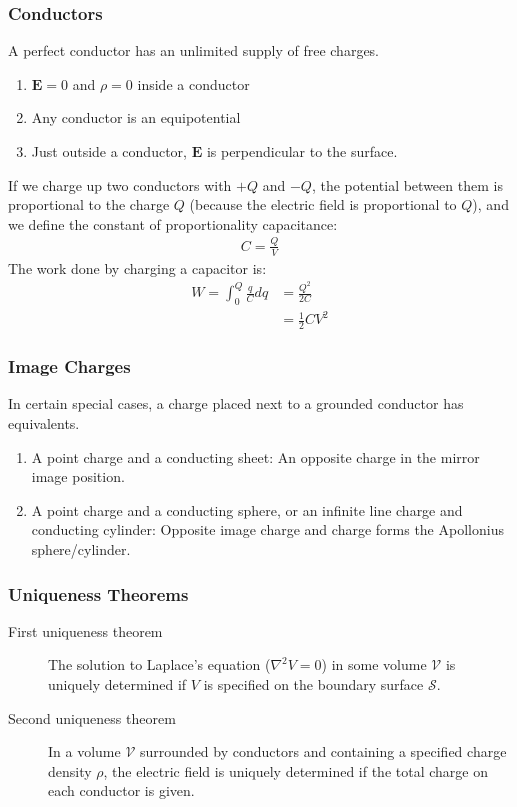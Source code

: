 \documentclass[a4paper]{article}
\newcommand{\ve}[1]{
  \ensuremath{\bm{#1}}}	               %
\begin{document}
\begin{multicols*}{2}
\subsubsection{Conductors}
A perfect conductor has an unlimited supply of free charges.
\begin{enumerate}
\item $\ve{E}=0$ and $\rho = 0$ inside a conductor
\item Any conductor is an equipotential
\item Just outside a conductor, $\ve{E}$ is perpendicular to the surface.
\end{enumerate}
If we charge up two conductors with $+Q$ and $-Q$, the potential between them is
proportional to the charge $Q$ (because the electric field is proportional to
$Q$), and we define the constant of proportionality capacitance:
\begin{align*}
  C=\frac{Q}{V}
\end{align*}
The work done by charging a capacitor is:
\begin{align*}
  W=\int_0^Q \frac{q}{C} dq &= \frac{Q^2}{2C}\\
  &=\frac{1}{2}CV^2
\end{align*}
\subsubsection{Image Charges}
In certain special cases, a charge placed next to a grounded conductor has
equivalents.
\begin{enumerate}
\item A point charge and a conducting sheet: An opposite charge in the mirror
  image position.
\item A point charge and a conducting sphere, or an infinite line charge and
  conducting cylinder: Opposite image charge and charge forms the Apollonius
  sphere/cylinder.
\end{enumerate}
\subsubsection{Uniqueness Theorems}
\begin{description}
\item[First uniqueness theorem] The solution to Laplace's equation
  ($\nabla^2V=0$) in some volume $\mathcal{V}$ is uniquely determined if $V$ is
  specified on the boundary surface $\mathcal{S}$.
\item[Second uniqueness theorem] In a volume $\mathcal{V}$ surrounded by
  conductors and containing a specified charge density $\rho$, the electric
  field is uniquely determined if the total charge on each conductor is given.
\end{description}

\end{multicols*}
\end{document}
